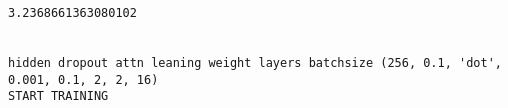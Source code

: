 \documentclass[11pt]{article}
\begin{document}
    \begin{center}
    \end{center}
    { \hspace*{\fill} \\}
    
    \begin{center}
    \end{center}
    { \hspace*{\fill} \\}
    
    \begin{Verbatim}[commandchars=\\\{\}]
3.2368661363080102


hidden dropout attn leaning weight layers batchsize (256, 0.1, 'dot', 0.001, 0.1, 2, 2, 16)
START TRAINING



    \end{Verbatim}

    \begin{center}
    \end{center}
    { \hspace*{\fill} \\}
    
    \begin{center}
    \end{center}
    { \hspace*{\fill} \\}
    
    \begin{center}
    \end{center}
    { \hspace*{\fill} \\}
    
    \begin{center}
    \end{center}
    { \hspace*{\fill} \\}
    
    \begin{center}
    \end{center}
    { \hspace*{\fill} \\}
    
\end{document}

